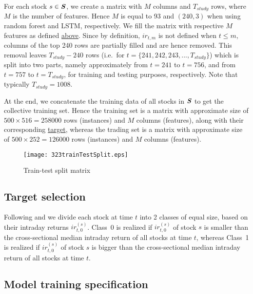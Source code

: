 \documentclass[review]{elsarticle}
\begin{document}
For each stock $s\in \textbf{\textit{S}}$, we create a matrix with $M$ columns and $T_{study}$ rows, where $M$ is the number of features. Hence $M$ is equal to 93 and $\left( 240, 3\right)$ when using random forest and LSTM, respectively. We fill the matrix with respective $M$ features as defined \hyperref[subsec:features]{above}. 
Since by definition, $ir_{t,m}$ is not defined when $t \leq m$, columns of the top 240 rows are partially filled and are hence removed. This removal leaves 
$T_{study}-240$ rows (i.e.\ for $t = \{241,242,243,...,T_{study}\}$) which is split into two parts, namely  approximately from $t=241$ to $t=756$, and  from $t=757$ to $t=T_{study}$, for training and testing purposes, respectively. Note that typically $T_{study}=1008$.
\par
At the end, we concatenate the training data of all stocks in $\textbf{\textit{S}}$ to get the collective training set. Hence the training set is a matrix with approximate size of $500 \times 516 = 258000$ rows (instances) and $M$ columns (features), along with their corresponding \hyperref[subsec:target]{target}, whereas the 
 trading set is a matrix with approximate size of $500 \times 252 = 126000$ rows (instances) and $M$ columns (features).
\begin{figure}[h!]
 	\centering
 	
 	\texttt{[image: 323trainTestSplit.eps]} \hfill
 	\caption{Train-test split matrix}
 	\label{fig:figure3.2.3.train_est_split}
 \end{figure}
\subsection{Target selection}
\label{subsec:target}
Following \cite{takeuchi2013} and \cite{krauss18} we divide  each 
stock at time $t$  into 2 classes of equal size, based on their intraday returns $ir^{(s)}_{t,0}$. Class~0 is realized if $ir^{(s)}_{t,0}$ of stock $s$ is smaller than the cross-sectional median intraday return of all stocks at time $t$, whereas  Class~1 is realized if $ir^{(s)}_{t,0}$ of stock $s$ is bigger than the cross-sectional median intraday return of all stocks at time $t$.



\subsection{Model training specification}
\end{document}
